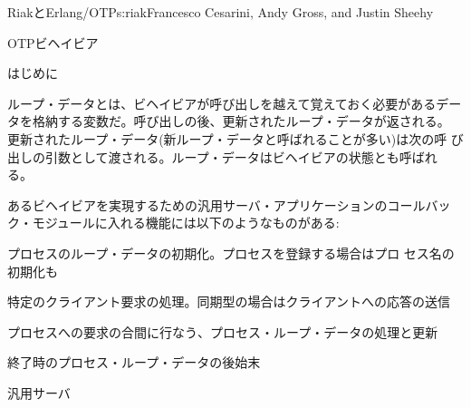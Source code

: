 \begin{aosachapter}{RiakとErlang/OTP}{s:riak}{Francesco Cesarini, Andy Gross, and Justin Sheehy}
\begin{aosasect1}{OTPビヘイビア}
\begin{aosasect2}{はじめに}
\begin{aosaitemize}
\end{aosaitemize}


ループ・データとは、ビヘイビアが呼び出しを越えて覚えておく必要があるデー
タを格納する変数だ。呼び出しの後、更新されたループ・データが返される。
更新されたループ・データ(新ループ・データと呼ばれることが多い)は次の呼
び出しの引数として渡される。ループ・データはビヘイビアの状態とも呼ばれ
る。


あるビヘイビアを実現するための汎用サーバ・アプリケーションのコールバッ
ク・モジュールに入れる機能には以下のようなものがある:

\begin{aosaitemize}

  \item プロセスのループ・データの初期化。プロセスを登録する場合はプロ
    セス名の初期化も

  \item 特定のクライアント要求の処理。同期型の場合はクライアントへの応答の送信

  \item プロセスへの要求の合間に行なう、プロセス・ループ・データの処理と更新

  \item 終了時のプロセス・ループ・データの後始末

\end{aosaitemize}

\end{aosasect2}

\begin{aosasect2}{汎用サーバ}


\end{aosasect2}
\end{aosasect1}
\end{aosachapter}
